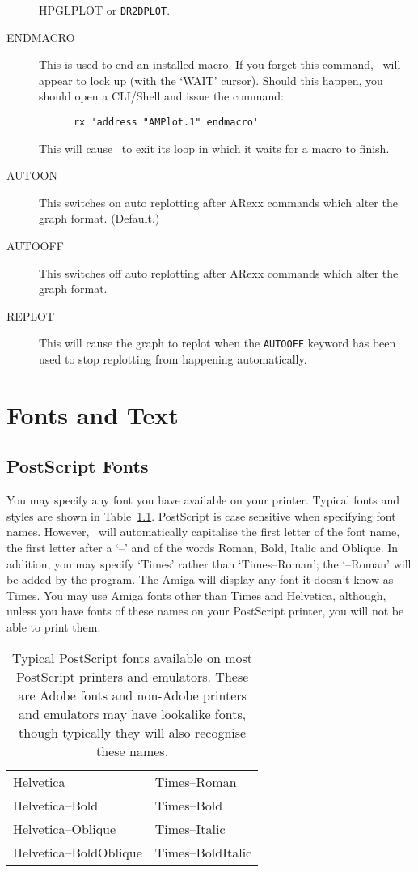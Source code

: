 \begin{description}
{HPGLPLOT} or {\tt DR2DPLOT}.
\item[ENDMACRO\dag] This is used to end an installed macro. If you forget this 
command, \amplot\ will appear to lock up (with the `WAIT' cursor). Should this 
happen, you should open a CLI/Shell and issue the command:
\begin{verbatim}
      rx 'address "AMPlot.1" endmacro'
\end{verbatim}
This will cause \amplot\ to exit its loop in which it waits for a macro to finish.
\item[AUTOON\dag] This switches on auto replotting after ARexx commands which alter 
the graph format. (Default.)
\item[AUTOOFF\dag] This switches off auto replotting after ARexx commands which alter 
the graph format.
\item[REPLOT\dag] This will cause the graph to replot when the {\tt AUTOOFF} keyword 
has been used to stop replotting from happening automatically.
\end{description}

\chapter{Fonts and Text}
\label{ch:fonts}

\section{PostScript Fonts}
You may specify any font you have available on 
your printer. Typical fonts and styles are shown in Table~\ref{tab:fonts}. 
PostScript is case sensitive when specifying font names. However, \amplot\ will
automatically capitalise the first letter of the font name, the first letter after a 
`--' and of the words Roman, 
Bold, Italic and Oblique. In addition, you may specify `Times' rather than
`Times--Roman'; the `--Roman' will be added by the program.
The Amiga will display any font it doesn't know as Times.
You may use Amiga fonts other than Times and Helvetica, although, unless you have 
fonts of these names on your PostScript printer, you will not be able to print 
them.
\begin{table}
\begin{center}
\begin{tabular}{|l|l|} \hline
Helvetica                & Times--Roman        \\
Helvetica--Bold          & Times--Bold         \\
Helvetica--Oblique       & Times--Italic       \\
Helvetica--BoldOblique   & Times--BoldItalic   \\ \hline
\end{tabular}
\end{center}
\caption[Typical PostScript Fonts]{\label{tab:fonts}Typical PostScript fonts 
available on most PostScript printers and emulators. These are Adobe fonts and 
non-Adobe printers and emulators may have lookalike fonts, though typically they 
will also recognise these names.}
\end{table}

